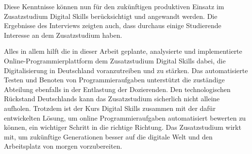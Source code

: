 Diese Kenntnisse können nun für den zukünftigen produktiven Einsatz im
Zusatzstudium Digital Skills berücksichtigt und angewandt werden. Die Ergebnisse
des Interviews zeigten auch, dass durchaus einige Studierende Interesse an dem
Zusatzstudium haben.

\newpage

Alles in allem hilft die in dieser Arbeit geplante, analysierte und
implementierte Online-Programmierplattform dem Zusatzstudium Digital Skills
dabei, die Digitalisierung in Deutschland voranzutreiben und zu stärken. Das
automatisierte Testen und Benoten von Programmieraufgaben unterstützt die
zuständige Abteilung ebenfalls in der Entlastung der Dozierenden. Den
technologischen Rückstand Deutschlands kann das Zusatzstudium sicherlich nicht
alleine aufholen. Trotzdem ist der Kurs Digital Skills zusammen mit der
dafür entwickelten Lösung, um online Programmieraufgaben automatisiert bewerten
zu können, ein wichtiger Schritt in die richtige Richtung. Das Zusatzstudium
wirkt mit, um zukünftige Generationen besser auf die digitale Welt und den
Arbeitsplatz von morgen vorzubereiten.
